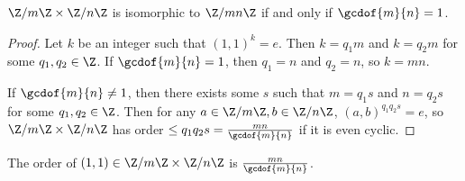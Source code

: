 \documentclass[12pt]{article}
\begin{document}
\begin{thm}
    $\Z/m\Z \times \Z/n\Z$ is isomorphic to $\Z/mn\Z$ if and only if $\gcdof{m}{n} = 1$.
\end{thm}

\begin{proof}\proofbreak
    Let $k$ be an integer such that $(1, 1)^k = e$. Then $k = q_1m$ and $k = q_2m$ for some $q_1, q_2 \in \Z$. If $\gcdof{m}{n} = 1$, then $q_1 = n$ and $q_2 = n$, so $k = mn$.

    If $\gcdof{m}{n} \neq 1$, then there exists some $s$ such that $m = q_1s$ and $n = q_2s$ for some $q_1, q_2 \in \Z$. Then for any $a \in \Z/m\Z, b \in \Z/n\Z$, $(a, b)^{q_1q_2s} = e$, so $\Z/m\Z \times \Z/n\Z$ has order $\leq q_1q_2s = \frac{mn}{\gcdof{m}{n}}$ if it is even cyclic.
\end{proof}

\begin{cor}
    The order of $(1, 1) \in \Z/m\Z \times \Z/n\Z$ is $\frac{mn}{\gcdof{m}{n}}$.
\end{cor}
\end{document}

